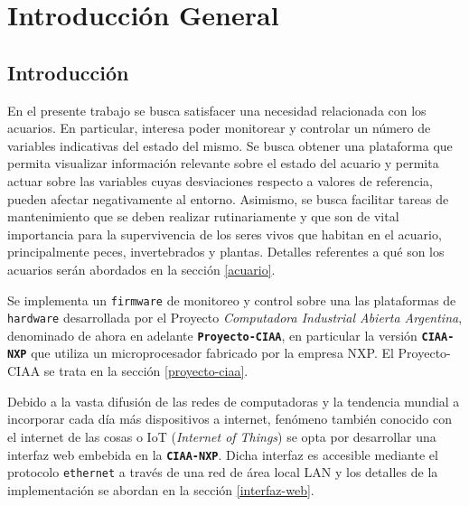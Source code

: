 
\chapter{Introducción General} %

\label{Chapter1} %
\label{IntroGeneral}


\newcommand{\keyword}[1]{\textbf{#1}}
\newcommand{\tabhead}[1]{\textbf{#1}}
\newcommand{\code}[1]{\texttt{#1}}
\newcommand{\file}[1]{\texttt{\bfseries#1}}
\newcommand{\option}[1]{\texttt{\itshape#1}}


\section{Introducción}

En el presente trabajo se busca satisfacer una necesidad relacionada con los acuarios. En particular, interesa poder monitorear y controlar un número de variables indicativas del estado del mismo.  Se busca obtener una plataforma que permita visualizar información relevante sobre el estado del acuario y permita actuar sobre las variables cuyas desviaciones respecto a valores de referencia, pueden afectar negativamente al entorno.  Asimismo, se busca facilitar tareas de mantenimiento que se deben realizar rutinariamente y que son de vital importancia para la supervivencia de los seres vivos que habitan en el acuario, principalmente peces, invertebrados y plantas. Detalles referentes a qué son los acuarios serán abordados en la sección \ref{acuario}.

Se implementa un \texttt{firmware} de monitoreo y control sobre una las plataformas de \texttt{hardware} desarrollada por el Proyecto \textit{Computadora Industrial Abierta Argentina}, denominado de ahora en adelante \textbf{\texttt{Proyecto-CIAA}}, en particular la versión \textbf{\texttt{CIAA-NXP}} que utiliza un microprocesador fabricado por la empresa NXP. El Proyecto-CIAA se trata en la sección \ref{proyecto-ciaa}.

Debido a la vasta difusión de las redes de computadoras y la tendencia mundial a incorporar cada día más dispositivos a internet, fenómeno también conocido con el internet de las cosas o IoT (\textit{Internet of Things}) se opta por desarrollar una interfaz web embebida en la \textbf{\texttt{CIAA-NXP}}.  Dicha interfaz es accesible mediante el protocolo \texttt{ethernet} a través de una red de área local LAN y los detalles de la implementación se abordan en la sección \ref{interfaz-web}.




